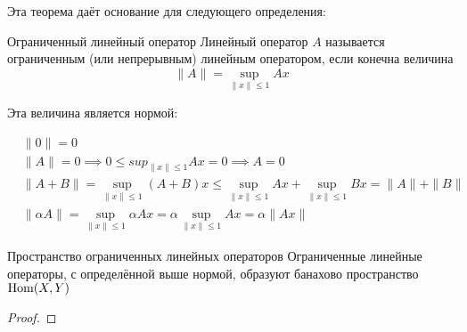 Эта теорема даёт основание для следующего определения:

\begin{dfn}{Ограниченный линейный оператор}
  Линейный оператор $A$
  называется ограниченным (или непрерывным) линейным оператором,
  если конечна величина
  $$\|A\| = \sup_{\|x\|\leq 1} A x$$

  Эта величина является нормой:

  \begin{align*}
    & \|0\| = 0 \\
    & \|A\| = 0 \implies 0\leq sup_{\|x\|\leq 1} A x = 0 \implies A = 0 \\
    & \|A + B\| = \sup_{\|x\|\leq 1} (A + B) x \leq \sup_{\|x\|\leq 1} A x + \sup_{\|x\|\leq 1} B x = \|A\| + \|B\| \\
    & \|\alpha A\| = \sup_{\|x\|\leq 1} \alpha A x = \alpha \sup_{\|x\|\leq 1} A x = \alpha \|A x\|
  \end{align*}
\end{dfn}

\begin{thm}{Пространство ограниченных линейных операторов}
  Ограниченные линейные операторы, с определённой выше нормой,
  образуют банахово пространство $\mathrm{Hom}(X,Y)$
\end{thm}
\begin{proof}
\end{proof}
